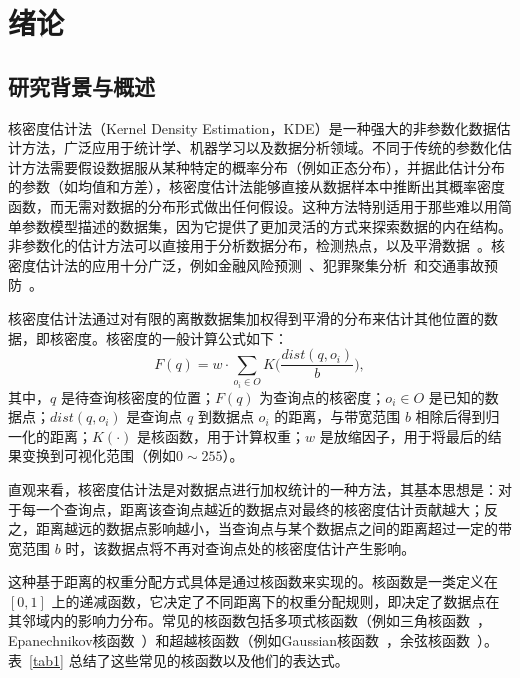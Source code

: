 \chapter{绪论}

\section{研究背景与概述}

核密度估计法（Kernel Density Estimation，KDE）是一种强大的非参数化数据估计方法，广泛应用于统计学、机器学习以及数据分析领域。不同于传统的参数化估计方法需要假设数据服从某种特定的概率分布（例如正态分布），并据此估计分布的参数（如均值和方差），核密度估计法能够直接从数据样本中推断出其概率密度函数，而无需对数据的分布形式做出任何假设。这种方法特别适用于那些难以用简单参数模型描述的数据集，因为它提供了更加灵活的方式来探索数据的内在结构。
非参数化的估计方法可以直接用于分析数据分布，检测热点，以及平滑数据~\cite{silverman_density_2018, gramacki_nonparametric_2018}。核密度估计法的应用十分广泛，例如金融风险预测~\cite{diebold_multivariate_1999, diebold_evaluating_1998, harvey_kernel_2012}、犯罪聚集分析~\cite{brunsdon_visualising_2007, nakaya_visualising_2010, hart_kernel_2014}和交通事故预防~\cite{black_highway_1991, xie_kernel_2008, plug_spatial_2011}。


核密度估计法通过对有限的离散数据集加权得到平滑的分布来估计其他位置的数据，即核密度。核密度的一般计算公式如下：
\begin{equation}
	F(q) = w \cdot \sum_{o_i \in O} {K}\Big(\frac{dist(q, o_i)}{b}\Big),
\end{equation}
其中，$q$ 是待查询核密度的位置；$F(q)$ 为查询点的核密度；$o_i \in O$ 是已知的数据点；$dist(q,o_i)$ 是查询点 $q$ 到数据点 $o_i$ 的距离，与带宽范围 $b$ 相除后得到归一化的距离；$K(\cdot)$ 是核函数，用于计算权重；$w$ 是放缩因子，用于将最后的结果变换到可视化范围（例如$0 \sim 255$）。

直观来看，核密度估计法是对数据点进行加权统计的一种方法，其基本思想是：对于每一个查询点，距离该查询点越近的数据点对最终的核密度估计贡献越大；反之，距离越远的数据点影响越小，当查询点与某个数据点之间的距离超过一定的带宽范围 $b$ 时，该数据点将不再对查询点处的核密度估计产生影响。

这种基于距离的权重分配方式具体是通过核函数来实现的。核函数是一类定义在 $[0, 1]$ 上的递减函数，它决定了不同距离下的权重分配规则，即决定了数据点在其邻域内的影响力分布。常见的核函数包括多项式核函数（例如三角核函数~\cite{fleuret_scale-invariance_2003, gong_estimating_2014}，Epanechnikov核函数~\cite{samiuddin_nonparametric_1990, bil_identification_2013}）和超越核函数（例如Gaussian核函数~\cite{scholkopf_comparing_1997, kristan_multivariate_2011}，余弦核函数~\cite{de_felice_short-term_2015}）。表~\ref{tab1} 总结了这些常见的核函数以及他们的表达式。

